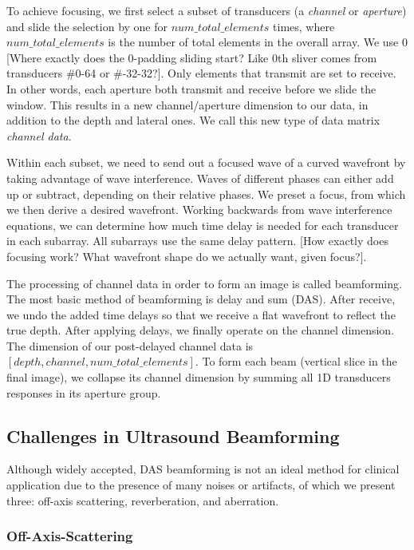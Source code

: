  To achieve focusing, we first select a subset of transducers (a \textit{channel} or
 \textit{aperture}) and slide the selection by one for $num\_total\_elements$ times, where $num\_total\_elements$ is the number of total elements in the overall array. We use 0 [Where exactly does the 0-padding sliding start? Like 0th sliver comes from transducers \#0-64 or \#-32-32?]. Only elements that transmit are set to receive. In other words, each aperture both transmit and receive before we slide the window. This results in a new channel/aperture dimension to our data, in addition to the depth and lateral ones. We call this new type of data matrix \textit{channel data}.

 Within each subset, we need to send out a focused wave of a curved wavefront by taking advantage of wave interference. Waves of different phases can either add up or subtract, depending on their relative phases. We preset a focus, from which we then derive a desired wavefront. Working backwards from wave interference equations, we can determine how much time delay is needed for each transducer in each subarray. All subarrays use the same delay pattern. [How exactly does focusing work? What wavefront shape do we actually want, given focus?].

 The processing of channel data in order to form an image is called beamforming. The most basic method of beamforming is delay and sum (DAS). After receive, we undo the added time delays so that we receive a flat wavefront to reflect the true depth. After applying delays, we finally operate on the channel dimension. The dimension of our post-delayed channel data is $[depth, channel, num\_total\_elements]$. To form each beam (vertical slice in the final image), we collapse its channel dimension by summing all 1D transducers responses in its aperture group.


\subsection{Challenges in Ultrasound Beamforming}

Although widely accepted, DAS beamforming is not an ideal method for clinical application due to the presence of many noises or artifacts, of which we present three: off-axis scattering, reverberation, and aberration.

\subsubsection{Off-Axis-Scattering}

